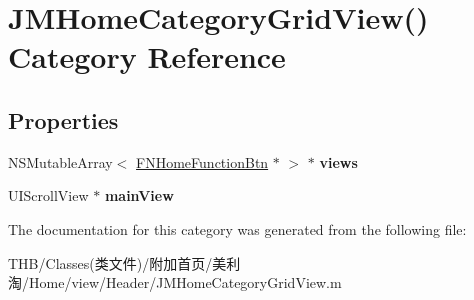 \hypertarget{category_j_m_home_category_grid_view_07_08}{}\section{J\+M\+Home\+Category\+Grid\+View() Category Reference}
\label{category_j_m_home_category_grid_view_07_08}
\subsection*{Properties}
\begin{DoxyCompactItemize}
\item 
\mbox{\label{category_j_m_home_category_grid_view_07_08_aa6b6fbf947d003b898801c2d24796224}} 
N\+S\+Mutable\+Array$<$ \mbox{\hyperlink{interface_f_n_home_function_btn}{F\+N\+Home\+Function\+Btn}} $\ast$ $>$ $\ast$ {\bfseries views}
\item 
\mbox{\label{category_j_m_home_category_grid_view_07_08_abab7156a0c944582f94c36352245a98c}} 
U\+I\+Scroll\+View $\ast$ {\bfseries main\+View}
\end{DoxyCompactItemize}


The documentation for this category was generated from the following file\+:\begin{DoxyCompactItemize}
\item 
T\+H\+B/\+Classes(类文件)/附加首页/美利淘/\+Home/view/\+Header/J\+M\+Home\+Category\+Grid\+View.\+m\end{DoxyCompactItemize}
